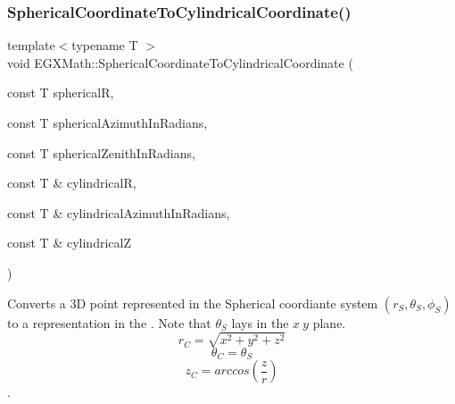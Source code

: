 \subsubsection{\texorpdfstring{Spherical\+Coordinate\+To\+Cylindrical\+Coordinate()}{SphericalCoordinateToCylindricalCoordinate()}}
{\footnotesize\ttfamily template$<$typename T $>$ \\
void E\+G\+X\+Math\+::\+Spherical\+Coordinate\+To\+Cylindrical\+Coordinate (\begin{DoxyParamCaption}\item[{const T}]{sphericalR,  }\item[{const T}]{spherical\+Azimuth\+In\+Radians,  }\item[{const T}]{spherical\+Zenith\+In\+Radians,  }\item[{const T \&}]{cylindricalR,  }\item[{const T \&}]{cylindrical\+Azimuth\+In\+Radians,  }\item[{const T \&}]{cylindricalZ }\end{DoxyParamCaption})}



Converts a 3D point represented in the Spherical coordiante system $(r_S,\theta_S,\phi_S)$ to a representation in the . Note that $\theta_S$ lays in the $x\ y$ plane. \[ r_C = \sqrt{x^2+y^2+z^2} \] \[ \theta_C = \theta_S \] \[ z_C = arccos(\frac{z}{r}) \]. 

